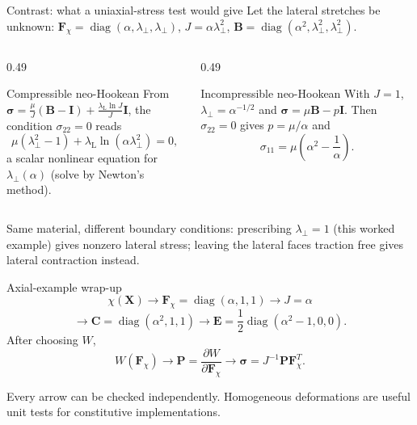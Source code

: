 \documentclass[aspectratio=169,11pt]{beamer}
\newcommand{\X}{\bm{X}}
\newcommand{\I}{\bm{I}}
\newcommand{\Fdef}{\bm{F}_{\chi}}
\newcommand{\Cten}{\bm{C}}
\newcommand{\Bten}{\bm{B}}
\newcommand{\Eten}{\bm{E}}
\newcommand{\sigmaC}{\bm{\sigma}}
\newcommand{\Pten}{\bm{P}}
\begin{document}
\begin{frame}{Contrast: what a uniaxial-stress test would give}
\small
Let the lateral stretches be unknown: \(\Fdef=\operatorname{diag}(\alpha,\lambda_\perp,\lambda_\perp)\), \(J=\alpha\lambda_\perp^2\), \(\Bten=\operatorname{diag}(\alpha^2,\lambda_\perp^2,\lambda_\perp^2)\).
\begin{columns}[T,onlytextwidth]
\begin{column}{0.49\textwidth}
\begin{block}{Compressible neo-Hookean}
From \(\sigmaC=\frac{\mu}{J}(\Bten-\I)+\frac{\lambda_{\mathrm L}\ln J}{J}\I\), the condition \(\sigma_{22}=0\) reads
\[
  \mu(\lambda_\perp^2-1)+\lambda_{\mathrm L}\ln(\alpha\lambda_\perp^2)=0,
\]
a scalar nonlinear equation for \(\lambda_\perp(\alpha)\) (solve by Newton's method).
\end{block}
\end{column}
\begin{column}{0.49\textwidth}
\begin{block}{Incompressible neo-Hookean}
With \(J=1\), \(\lambda_\perp=\alpha^{-1/2}\) and \(\sigmaC=\mu\Bten-p\I\). Then \(\sigma_{22}=0\) gives \(p=\mu/\alpha\) and
\[
  \sigma_{11}=\mu\left(\alpha^2-\frac{1}{\alpha}\right).
\]
\end{block}
\end{column}
\end{columns}
\medskip
\begin{punchbox}
\small
Same material, different boundary conditions: prescribing \(\lambda_\perp=1\) (this worked example) gives nonzero lateral stress; leaving the lateral faces traction free gives lateral contraction instead.
\end{punchbox}
\end{frame}

\begin{frame}{Axial-example wrap-up}
\[
  \chi(\X)
  \longrightarrow
  \Fdef=\operatorname{diag}(\alpha,1,1)
  \longrightarrow
  J=\alpha
\]
\[
  \longrightarrow
  \Cten=\operatorname{diag}(\alpha^2,1,1)
  \longrightarrow
  \Eten=\frac12\operatorname{diag}(\alpha^2-1,0,0).
\]
After choosing \(W\),
\[
  W(\Fdef)
  \longrightarrow
  \Pten=\frac{\partial W}{\partial\Fdef}
  \longrightarrow
  \sigmaC=J^{-1}\Pten\Fdef^T.
\]
\begin{punchbox}
\small
Every arrow can be checked independently. Homogeneous deformations are useful unit tests for constitutive implementations.
\end{punchbox}
\end{frame}
\end{document}
